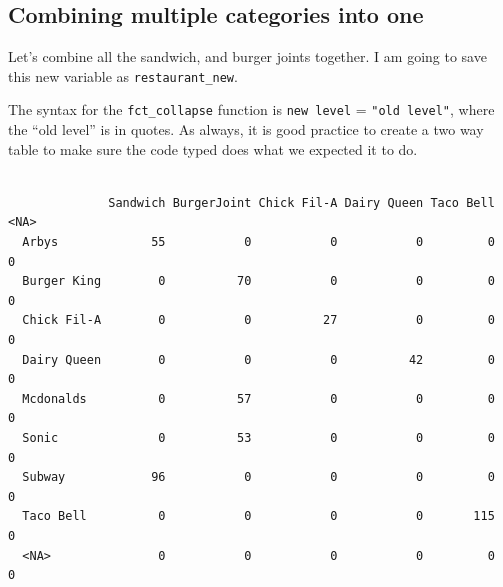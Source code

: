 \documentclass[
  letterpaper,
  DIV=11,
  numbers=noendperiod,
  oneside]{scrreprt}
\newenvironment{Shaded}{\begin{snugshade}}{\end{snugshade}}
\newcommand{\AttributeTok}[1]{\textcolor[rgb]{0.40,0.45,0.13}{#1}}
\newcommand{\FunctionTok}[1]{\textcolor[rgb]{0.28,0.35,0.67}{#1}}
\newcommand{\NormalTok}[1]{\textcolor[rgb]{0.00,0.23,0.31}{#1}}
\newcommand{\OtherTok}[1]{\textcolor[rgb]{0.00,0.23,0.31}{#1}}
\newcommand{\SpecialCharTok}[1]{\textcolor[rgb]{0.37,0.37,0.37}{#1}}
\newcommand{\StringTok}[1]{\textcolor[rgb]{0.13,0.47,0.30}{#1}}
\begin{document}
\subsection{Combining multiple categories into
one}\label{combining-multiple-categories-into-one}

Let's combine all the sandwich, and burger joints together. I am going
to save this new variable as \texttt{restaurant\_new}.

The syntax for the \texttt{fct\_collapse} function is
\texttt{new\ level} = \texttt{"old\ level"}, where the ``old level'' is
in quotes. As always, it is good practice to create a two way table to
make sure the code typed does what we expected it to do.

\begin{Shaded}
\end{Shaded}

\begin{verbatim}
             
              Sandwich BurgerJoint Chick Fil-A Dairy Queen Taco Bell <NA>
  Arbys             55           0           0           0         0    0
  Burger King        0          70           0           0         0    0
  Chick Fil-A        0           0          27           0         0    0
  Dairy Queen        0           0           0          42         0    0
  Mcdonalds          0          57           0           0         0    0
  Sonic              0          53           0           0         0    0
  Subway            96           0           0           0         0    0
  Taco Bell          0           0           0           0       115    0
  <NA>               0           0           0           0         0    0
\end{verbatim}
\end{document}
